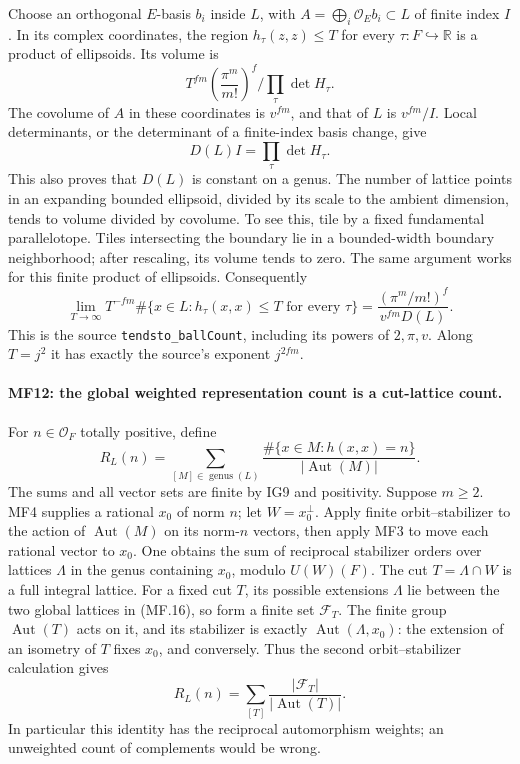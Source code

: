 Choose an orthogonal \(E\)-basis \(b_i\) inside \(L\), with
\(A=\bigoplus_i\mathcal O_E b_i\subset L\) of finite index \(I\).
In its complex coordinates, the region
\(h_\tau(z,z)\le T\) for every \(\tau:F\hookrightarrow\mathbb R\)
is a product of ellipsoids. Its volume is
\[
 T^{fm}\left(\frac{\pi^m}{m!}\right)^f
                 \Big/\prod_\tau\det H_\tau.
\]
The covolume of \(A\) in these coordinates is \(v^{fm}\), and
that of \(L\) is \(v^{fm}/I\).
Local determinants, or the determinant of a finite-index basis
change, give
\[
                  D(L)I=\prod_\tau\det H_\tau.        \tag{MF.24}
\]
This also proves that \(D(L)\) is constant on a genus.
The number of lattice points in an expanding bounded ellipsoid,
divided by its scale to the ambient dimension, tends to volume
divided by covolume. To see this, tile by a fixed fundamental
parallelotope. Tiles intersecting the boundary lie in a bounded-width
boundary neighborhood; after rescaling, its volume tends to zero.
The same argument works for this finite product of ellipsoids.
Consequently
\[
 \lim_{T\to\infty}T^{-fm}
 \#\{x\in L:h_\tau(x,x)\le T\text{ for every }\tau\}
       =\frac{(\pi^m/m!)^f}{v^{fm}D(L)}.              \tag{MF.25}
\]
This is the source \texttt{tendsto\_ballCount}, including its powers
of \(2,\pi,v\). Along \(T=j^2\) it has exactly the source's exponent
\(j^{2fm}\).

\paragraph{MF12: the global weighted representation count is a cut-lattice count.}
For \(n\in\mathcal O_F\) totally positive, define
\[
 R_L(n)=\sum_{[M]\in\operatorname{genus}(L)}
       \frac{\#\{x\in M:h(x,x)=n\}}{|\operatorname{Aut}(M)|}.
                                                               \tag{MF.26}
\]
The sums and all vector sets are finite by IG9 and positivity.
Suppose \(m\ge2\). MF4 supplies a rational \(x_0\) of norm \(n\);
let \(W=x_0^\perp\).
Apply finite orbit--stabilizer to the action of
\(\operatorname{Aut}(M)\) on its norm-\(n\) vectors, then apply
MF3 to move each rational vector to \(x_0\).
One obtains the sum of reciprocal stabilizer orders over lattices
\(\Lambda\) in the genus containing \(x_0\), modulo \(U(W)(F)\).
The cut \(T=\Lambda\cap W\) is a full integral lattice.
For a fixed cut \(T\), its possible extensions \(\Lambda\) lie
between the two global lattices in (MF.16), so form a finite set
\(\mathcal F_T\). The finite group \(\operatorname{Aut}(T)\) acts on
it, and its stabilizer is exactly
\(\operatorname{Aut}(\Lambda,x_0)\): the extension of an isometry
of \(T\) fixes \(x_0\), and conversely.
Thus the second orbit--stabilizer calculation gives
\[
                       R_L(n)=\sum_{[T]}
                    \frac{|\mathcal F_T|}{|\operatorname{Aut}(T)|}.
                                                               \tag{MF.27}
\]
In particular this identity has the reciprocal automorphism weights;
an unweighted count of complements would be wrong.

